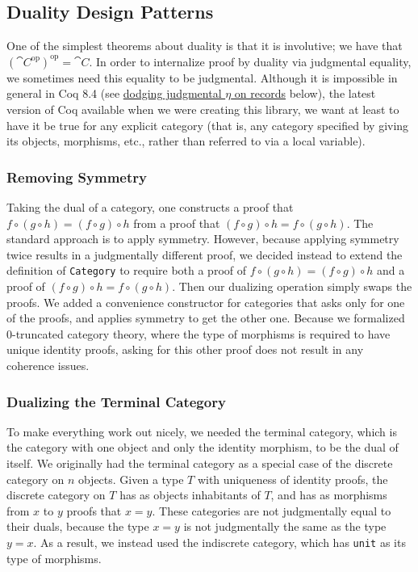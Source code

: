   \subsection{Duality Design Patterns}
    One of the simplest theorems about duality is that it is involutive; we have that $(\cat{C}^{\text{op}})^{\text{op}} = \cat{C}$.
    In order to internalize proof by duality via judgmental equality, we sometimes need this equality to be judgmental.
    Although it is impossible in general in Coq 8.4 (see \hyperref[sec:no-judgmental-eta]{dodging judgmental \texorpdfstring{$\eta$}{η} on records} below), the latest version of Coq available when we were creating this library, we want at least to have it be true for any explicit category (that is, any category specified by giving its objects, morphisms, etc., rather than referred to via a local variable).

    \subsubsection{Removing Symmetry} \label{sec:remove-symmetry}
      Taking the dual of a category, one constructs a proof that $f \circ (g \circ h) = (f \circ g) \circ h$ from a proof that $(f \circ g) \circ h = f \circ (g \circ h)$.
      The standard approach is to apply symmetry.
      However, because applying symmetry twice results in a judgmentally different proof, we decided instead to extend the definition of \texttt{Category} to require both a proof of $f \circ (g \circ h) = (f \circ g) \circ h$ and a proof of $(f \circ g) \circ h = f \circ (g \circ h)$.
      Then our dualizing operation simply swaps the proofs.
      We added a convenience constructor for categories that asks only for one of the proofs, and applies symmetry to get the other one.
      Because we formalized 0-truncated category theory, where the type of morphisms is required to have unique identity proofs, asking for this other proof does not result in any coherence issues.

    \subsubsection{Dualizing the Terminal Category}
      To make everything work out nicely, we needed the terminal category, which is the category with one object and only the identity morphism, to be the dual of itself.
      We originally had the terminal category as a special case of the discrete category on $n$ objects.
      Given a type $T$ with uniqueness of identity proofs, the discrete category on $T$ has as objects inhabitants of $T$, and has as morphisms from $x$ to $y$ proofs that $x = y$.
      These categories are not judgmentally equal to their duals, because the type $x = y$ is not judgmentally the same as the type $y = x$.
      As a result, we instead used the indiscrete category, which has \texttt{unit} as its type of morphisms.

